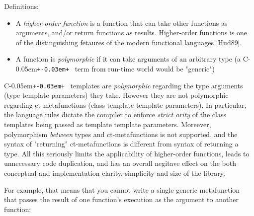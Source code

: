 \documentclass{netobjectdays}
\newcommand{\Cpp}{C\kern-0.05em\texttt{+\kern-0.03em+}%
}
\begin{document}
Definitions: 
\begin{itemize}
  \item  A \emph{higher-order function} is a function 
  that can take other functions as arguments, and/or 
  return functions as results. Higher-order functions 
  is one of the distinguishing fetaures of the modern 
  functional languages [Hud89]. 

  \item A function is \emph{polymorphic} if it can 
  take arguments of an arbitrary type (a \Cpp\ term 
  from run-time world would be "generic")
\end{itemize}

\Cpp\ templates are \emph{polymorphic} regarding the type 
arguments (type template parameters) they take. However they 
are not polymorphic regarding ct-metafunctions (class 
template template parameters). In particular, the language 
rules dictate the compiler to enforce \emph{strict arity} of 
the class templates being passed as template template 
parameters. Moreever, polymorphism \emph{between} types and 
ct-metafunctions is not supported, and the syntax of 
"returning" ct-metafunctions is different from syntax of 
returning a type. All this seriously limits the 
applicability of higher-order functions, leads to 
unnecessary code duplication, and has an overall negitave 
effect on the both conceptual and implementation clarity, 
simplicity and size of the library.


For example, that means that you cannot write a single 
generic metafunction that passes the result of one 
function's execution as the argument to another function:

\end{document}
